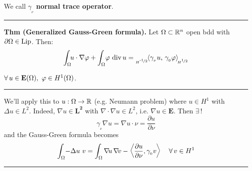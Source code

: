 We call $\gamma_{_\nu}$ \textbf{normal trace operator}.

\rule{0.31\textwidth}{0.2pt}
\smallskip

\textbf{Thm (Generalized Gauss-Green formula).} Let $\Omega\subset\mathbb{R}^n$ open bdd with $\partial\Omega\in\operatorname{Lip}$. Then:
\begin{equation*}
\int_\Omega\!\! u\cdot\nabla\varphi+\int_\Omega\!\varphi\,\operatorname{div} u={}_{_{H^{\nicefrac{\text{-}1}{2}}}}\!\!\left\langle \gamma_{_\nu} u,\,\gamma_{_0}\varphi \right\rangle\!\!{}_{_{H^{\nicefrac{1}{2}}}}
\end{equation*}

$\forall\, u\in\mathbf{E}(\Omega),\ \varphi\in H^1(\Omega)$.

\rule{0.31\textwidth}{0.2pt}
\smallskip

We'll apply this to $u:\Omega\to\mathbb{R}$ (e.g. Neumann problem) where $u\in H^1$ with $\Delta u\in L^2$. Indeed, $\nabla u \in \mathbf{L^2}$ with $\nabla\!\cdot\!\nabla u \in L^2$, i.e. $\nabla u \in \mathbf{E}$. Then $\exists\, !$
\begin{equation*}
\gamma_{_\nu} \nabla u=\nabla u \cdot \nu = \frac{\partial u}{\partial \nu} 
\end{equation*}
and the Gauss-Green formula becomes
\begin{equation*}
\int_\Omega\!- \Delta u\ v=\int_\Omega \nabla\! u\,\nabla\! v -\left\langle \frac{\partial u}{\partial \nu}, \gamma_{_0} v \right\rangle\quad\forall\, v\in H^1
\end{equation*}

\rule{0.31\textwidth}{1pt}










